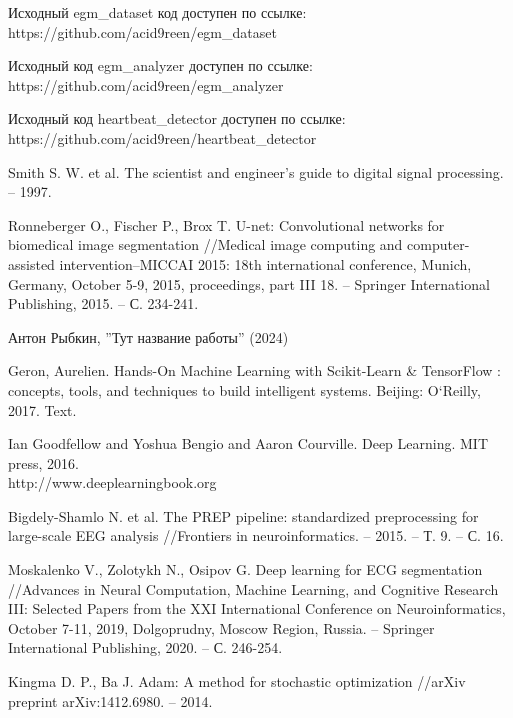 \begingroup
\begin{thebibliography}{00}
    Исходный egm\_dataset код доступен по ссылке: https://github.com/acid9reen/egm\_dataset

    Исходный код egm\_analyzer доступен по ссылке: https://github.com/acid9reen/egm\_analyzer

    Исходный код heartbeat\_detector доступен по ссылке:\\
    https://github.com/acid9reen/heartbeat\_detector

    Smith S. W. et al. The scientist and engineer's guide to digital signal processing. -- 1997.

    Ronneberger O., Fischer P., Brox T. U-net: Convolutional networks for
    biomedical image segmentation //Medical image computing and
    computer-assisted intervention–MICCAI 2015: 18th international conference,
    Munich, Germany, October 5-9, 2015, proceedings, part III 18. – Springer
    International Publishing, 2015. – С. 234-241.

    Антон Рыбкин, ''Тут название работы'' (2024)

    Geron, Aurelien. Hands-On Machine Learning with Scikit-Learn \& TensorFlow
    : concepts, tools, and techniques to build intelligent systems. Beijing:
    O`Reilly, 2017. Text.

    Ian Goodfellow and Yoshua Bengio and Aaron Courville. Deep Learning. MIT
    press, 2016.\\ http://www.deeplearningbook.org

    Bigdely-Shamlo N. et al. The PREP pipeline: standardized preprocessing for
    large-scale EEG analysis //Frontiers in neuroinformatics. – 2015. – Т. 9. –
    С. 16.

    Moskalenko V., Zolotykh N., Osipov G. Deep learning for ECG segmentation
    //Advances in Neural Computation, Machine Learning, and Cognitive Research
    III: Selected Papers from the XXI International Conference on
    Neuroinformatics, October 7-11, 2019, Dolgoprudny, Moscow Region, Russia. –
    Springer International Publishing, 2020. – С. 246-254.

    Kingma D. P., Ba J. Adam: A method for stochastic optimization //arXiv
    preprint arXiv:1412.6980. – 2014.


\end{thebibliography}
